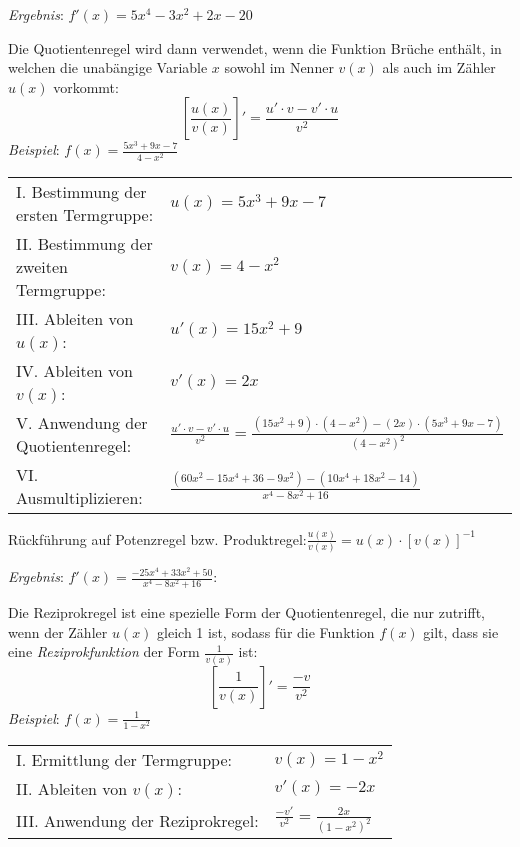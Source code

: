 \emph{Ergebnis}: $f'(x) = 5x^4 - 3x^2 + 2x - 20$

\pagebreak


Die Quotientenregel wird dann verwendet, wenn die Funktion Br\"{u}che enth\"{a}lt, in welchen die unab\"{a}ngige Variable $x$ sowohl im Nenner $v(x)$ als auch im Z\"{a}hler $u(x)$ vorkommt: $$\left[\frac{u(x)}{v(x)}\right]' = \frac{u' \cdot v - v' \cdot u}{v^2}$$
\emph{Beispiel}: $f(x) = \frac{5x^3 + 9x - 7}{4-x^2}$

\begin{tabular}{l l}
	I. Bestimmung der ersten Termgruppe: & $u(x) = 5x^3 + 9x - 7$
	\extrapar \\
	II. Bestimmung der zweiten Termgruppe: & $v(x) = 4 - x^2$
	\extrapar \\
	III. Ableiten von $u(x)$: & $u'(x) = 15x^2 + 9$
	\extrapar \\
	IV. Ableiten von $v(x)$: & $v'(x) = 2x$
	\extrapar \\
	V. Anwendung der Quotientenregel: & $\frac{u' \cdot v - v' \cdot u}{v^2} = \frac{(15x^2 + 9) \cdot (4-x^2) - (2x) \cdot (5x^3 + 9x - 7)}{(4-x^2)^2}$
	\extrapar \\
	VI. Ausmultiplizieren: & $\frac{(60x^2 - 15x^4 + 36 - 9x^2) - (10x^4 + 18x^2 - 14)}{x^4 - 8x^2 + 16}$
\end{tabular}

R\"{u}ckf\"{u}hrung auf Potenzregel bzw. Produktregel:\hspace{1cm}$\frac{u(x)}{v(x)} = u(x) \cdot [v(x)]^{-1}$

\emph{Ergebnis}: $f'(x) = \frac{-25x^4 +33x^2 + 50}{x^4 - 8x^2 + 16}$:


Die Reziprokregel ist eine spezielle Form der Quotientenregel, die nur zutrifft, wenn der Z\"{a}hler $u(x)$ gleich 1 ist, sodass f\"{u}r die Funktion $f(x)$ gilt, dass sie eine \emph{Reziprokfunktion} der Form $\frac{1}{v(x)}$ ist: $$\left[\frac{1}{v(x)}\right]' = \frac{-v}{v^2}$$
\emph{Beispiel}: $f(x) = \frac{1}{1 - x^2}$

\begin{tabular}{l l}
	I. Ermittlung der Termgruppe: & $v(x) = 1 - x^2$
	\extrapar \\
	II. Ableiten von $v(x)$: & $v'(x) = -2x$
	\extrapar \\
	III. Anwendung der Reziprokregel: & $\frac{-v'}{v^2} = \frac{2x}{(1-x^2)^2}$
\end{tabular}

